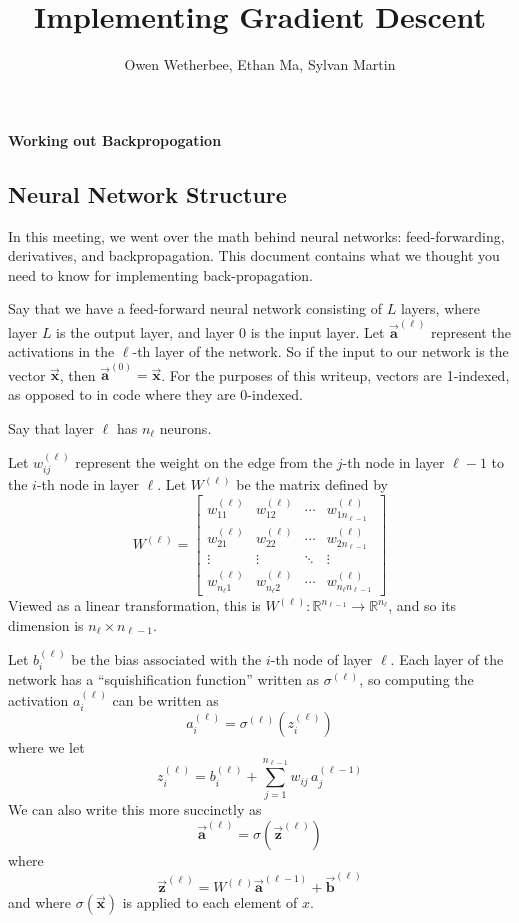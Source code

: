 \documentclass[12pt, letterpaper]{article}
\title{Implementing Gradient Descent}
\author{Owen Wetherbee, Ethan Ma, Sylvan Martin}
\date{}
\theoremstyle{definition}
\theoremstyle{remark}
\newcommand{\vect}[1]{\vec{\mathbf{#1}}}
\newcommand{\R}{\mathbb{R}}
\begin{document}
\maketitle

\begin{center}
    \textbf{Working out Backpropogation}
\end{center}

\subsection{Neural Network Structure}

In this meeting, we went over the math behind neural networks: feed-forwarding,
derivatives, and backpropagation. This document contains what we thought you need to know 
for implementing back-propagation.

Say that we have a feed-forward neural network consisting of $L$ layers, where 
layer $L$ is the output layer, and layer $0$ is the input layer. Let $\vect{a}^{(\ell)}$ represent the activations 
in the $\ell$-th layer of the network. So if the input to our network is the vector $\vect{x}$, then $\vect{a}^{(0)} = \vect{x}$.
For the purposes of this writeup, vectors are 1-indexed, as opposed to in code where they are 0-indexed.

Say that layer $\ell$ has $n_\ell$ neurons.

Let $w_{ij}^{(\ell)}$ represent the weight on the edge from the $j$-th node in layer $\ell - 1$ to the $i$-th node in layer $\ell$.
Let $W^{(\ell)}$ be the matrix defined by 
\[
    W^{(\ell)} = \left[
        \begin{array}{cccc}
            w_{11}^{(\ell)} & w_{12}^{(\ell)} & \cdots & w_{1n_{\ell - 1}}^{(\ell)} \\
            w_{21}^{(\ell)} & w_{22}^{(\ell)} & \cdots & w_{2n_{\ell - 1}}^{(\ell)} \\
            \vdots          & \vdots          & \ddots & \vdots \\
            w_{n_\ell 1}^{(\ell)} & w_{n_\ell 2}^{(\ell)} & \cdots & w_{n_\ell n_{\ell - 1}}^{(\ell)}
        \end{array}
    \right]
\]
Viewed as a linear transformation, this is $W^{(\ell)}: \R^{n_{\ell - 1}} \to \R^{n_\ell}$, and so its dimension is $n_{\ell} \times n_{\ell - 1}$.

Let $b_i^{(\ell)}$ be the bias associated with the $i$-th node of layer $\ell$.
Each layer of the network has a ``squishification function'' written as $\sigma^{(\ell)}$, so computing the activation $a_i^{(\ell)}$ can 
be written as 
\[
    a_i^{(\ell)} = \sigma^{(\ell)} \left(
        z_i^{(\ell)}
    \right) 
\]
where we let 
\[
    z_i^{(\ell)} = b_i^{(\ell)} + \sum_{j = 1}^{n_{\ell - 1}} w_{ij} \, a_j^{(\ell - 1)}
\]
We can also write this more succinctly as  
\[
    \vect{a}^{(\ell)} = \sigma\left( \vect z^{(\ell)} \right)
\]
where \[
    \vect z^{(\ell)} = W^{(\ell)} \vect{a}^{(\ell - 1)} + \vect{b}^{(\ell)}
\]
and where $\sigma(\vect x)$ is applied to each element of $x$.
\end{document}

